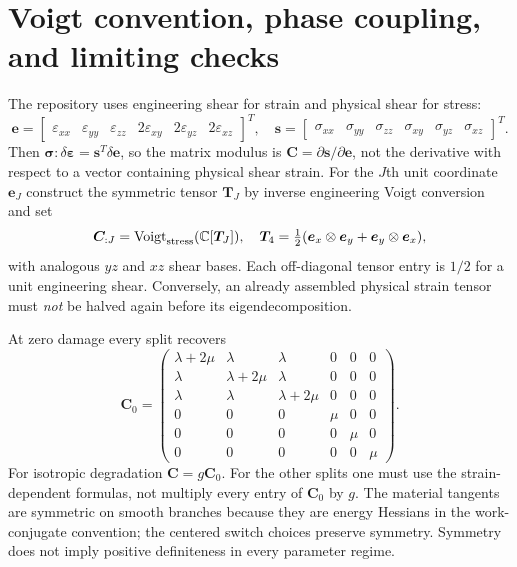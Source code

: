 \documentclass[11pt,a4paper]{article}
\newcommand{\eps}{\bm{\varepsilon}}
\newcommand{\sig}{\bm{\sigma}}
\newcommand{\C}{\mathbb{C}}
\newcommand{\sectionpage}[1]{\clearpage\section{#1}}
\numberwithin{equation}{section}
\begin{document}
\sectionpage{Voigt convention, phase coupling, and limiting checks}
\label{sec:voigt}
The repository uses engineering shear for strain and physical shear for stress:
\begin{equation}
 \bm e=\begin{bmatrix}\varepsilon_{xx}&\varepsilon_{yy}&\varepsilon_{zz}&
 2\varepsilon_{xy}&2\varepsilon_{yz}&2\varepsilon_{xz}\end{bmatrix}^T,
 \quad
 \bm s=\begin{bmatrix}\sigma_{xx}&\sigma_{yy}&\sigma_{zz}&
 \sigma_{xy}&\sigma_{yz}&\sigma_{xz}\end{bmatrix}^T.
\end{equation}
Then $\sig:\delta\eps=\bm s^T\delta\bm e$, so the matrix modulus is
$\bm C=\partial\bm s/\partial\bm e$, not the derivative with respect to a
vector containing physical shear strain. For the $J$th unit coordinate
$\bm e_J$ construct the symmetric tensor $\bm T_J$ by inverse engineering
Voigt conversion and set
\begin{equation}
 \bm C_{:J}=\operatorname{Voigt}_{\rm stress}(\C[\bm T_J]),\quad
 \bm T_4=\tfrac12(\bm e_x\otimes\bm e_y+\bm e_y\otimes\bm e_x),
 \label{eq:voigt-C}
\end{equation}
with analogous $yz$ and $xz$ shear bases. Each off-diagonal tensor entry is
$1/2$ for a unit engineering shear. Conversely, an already assembled physical
strain tensor must \emph{not} be halved again before its eigendecomposition.

At zero damage every split recovers
\begin{equation}
 \bm C_0=\begin{pmatrix}
 \lambda+2\mu&\lambda&\lambda&0&0&0\\
 \lambda&\lambda+2\mu&\lambda&0&0&0\\
 \lambda&\lambda&\lambda+2\mu&0&0&0\\
 0&0&0&\mu&0&0\\0&0&0&0&\mu&0\\0&0&0&0&0&\mu
 \end{pmatrix}.\label{eq:C0}
\end{equation}
For isotropic degradation $\bm C=g\bm C_0$. For the other splits one must
use the strain-dependent formulas, not multiply every entry of $\bm C_0$ by
$g$. The material tangents are symmetric on smooth branches because they are
energy Hessians in the work-conjugate convention; the centered switch choices
preserve symmetry. Symmetry does not imply positive definiteness in every
parameter regime.
\end{document}
